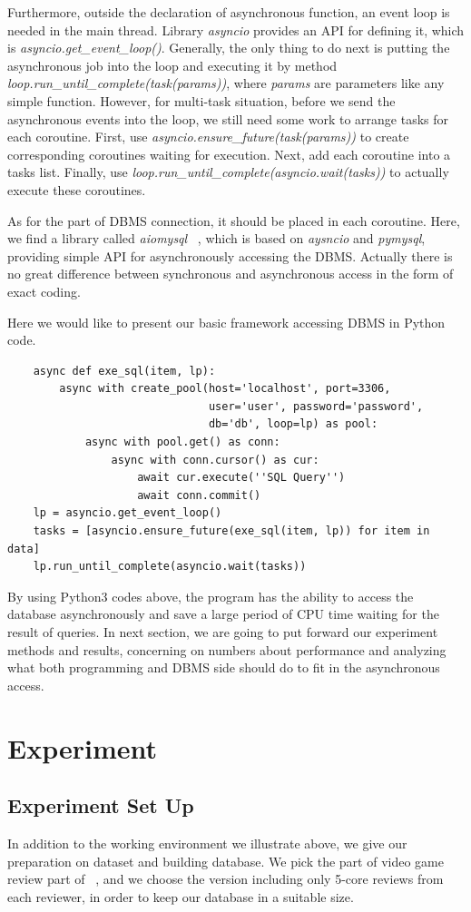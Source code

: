 \documentclass[onecolumn, conference, 12pt]{IEEEtran}
\begin{document}
	Furthermore, outside the declaration of asynchronous function, an event loop is needed in the main thread. Library \textit{asyncio} provides an API for defining it, which is \textit{asyncio.get\_event\_loop()}. Generally, the only thing to do next is putting the asynchronous job into the loop and executing it by method \textit{loop.run\_until\_complete(task(params))}, where \textit{params} are parameters like any simple function. However, for multi-task situation, before we send the asynchronous events into the loop, we still need some work to arrange tasks for each coroutine. First, use \textit{asyncio.ensure\_future(task(params))} to create corresponding coroutines waiting for execution. Next, add each coroutine into a tasks list. Finally, use \textit{loop.run\_until\_complete(asyncio.wait(tasks))} to actually execute these coroutines.

	As for the part of DBMS connection, it should be placed in each coroutine. Here, we find a library called \textit{aiomysql} ~\cite{aiomysql}, which is based on \textit{aysncio} and \textit{pymysql}, providing simple API for asynchronously accessing the DBMS. Actually there is no great difference between synchronous and asynchronous access in the form of exact coding. 

	Here we would like to present our basic framework accessing DBMS in Python code.
	\lstset{language=python,tabsize=2}
	\begin{lstlisting}
	async def exe_sql(item, lp):
		async with create_pool(host='localhost', port=3306,
							   user='user', password='password',
							   db='db', loop=lp) as pool:
			async with pool.get() as conn:
				async with conn.cursor() as cur:
					await cur.execute(''SQL Query'')
					await conn.commit()
	lp = asyncio.get_event_loop()
	tasks = [asyncio.ensure_future(exe_sql(item, lp)) for item in data]
	lp.run_until_complete(asyncio.wait(tasks))
	\end{lstlisting}
	
	By using Python3 codes above, the program has the ability to access the database asynchronously and save a large period of CPU time waiting for the result of queries. In next section, we are going to put forward our experiment methods and results, concerning on numbers about performance and analyzing what both programming and DBMS side should do to fit in the asynchronous access. 
	\section{Experiment}
	\subsection{Experiment Set Up}
	In addition to the working environment we illustrate above, we give our preparation on dataset and building database. 
	We pick the part of video game review part of ~\cite{Amazon}, and we choose the version including only 5-core reviews from each reviewer, in order to keep our database in a suitable size. 
\end{document}
